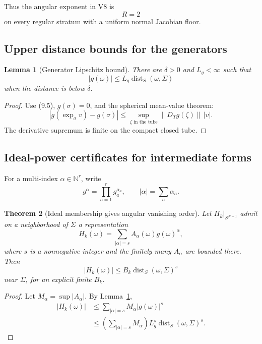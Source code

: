 \documentclass[11pt]{article}
\newtheorem{theorem}{Theorem}[section]
\newtheorem{lemma}[theorem]{Lemma}
\theoremstyle{remark}
\begin{document}
Thus the angular exponent in V8 is
\[
 R=2                                                   \tag{9.9}
\]
on every regular stratum with a uniform normal Jacobian floor.

\subsection{Upper distance bounds for the generators}

\begin{lemma}[Generator Lipschitz bound]
\label{lem:v17v9-generator-upper}
There are \(\delta>0\) and \(L_g<\infty\) such that
\[
 |g(\omega)|
 \leq L_g\operatorname{dist}_S(\omega,\Sigma)       \tag{9.10}
\]
when the distance is below \(\delta\).
\end{lemma}

\begin{proof}
Use (9.5), \(g(\sigma)=0\), and the spherical mean-value theorem:
\[
 |g(\exp_\sigma v)-g(\sigma)|
 \leq
 \sup_{\zeta\text{ in the tube}}\|D_Tg(\zeta)\|\,|v|.
\]
The derivative supremum is finite on the compact closed tube.
\end{proof}

\subsection{Ideal-power certificates for intermediate forms}

For a multi-index \(\alpha\in\mathbb N^r\), write
\[
 g^\alpha=\prod_{a=1}^rg_a^{\alpha_a},
 \qquad |\alpha|=\sum_a\alpha_a.
\]

\begin{theorem}[Ideal membership gives angular vanishing order]
\label{thm:v17v9-ideal}
Let \(H_k|_{S^{N-1}}\) admit on a neighborhood of \(\Sigma\) a
representation
\[
 H_k(\omega)
 =
 \sum_{|\alpha|=s}
 A_\alpha(\omega)g(\omega)^\alpha,                 \tag{9.11}
\]
where \(s\) is a nonnegative integer and the finitely many
\(A_\alpha\) are bounded there.  Then
\[
 |H_k(\omega)|
 \leq B_k\operatorname{dist}_S(\omega,\Sigma)^s    \tag{9.12}
\]
near \(\Sigma\), for an explicit finite \(B_k\).
\end{theorem}

\begin{proof}
Let \(M_\alpha=\sup|A_\alpha|\).  By
Lemma~\ref{lem:v17v9-generator-upper},
\[
\begin{split}
 |H_k(\omega)|
 &\leq
 \sum_{|\alpha|=s}
 M_\alpha|g(\omega)|^s\\
 &\leq
 \left(\sum_{|\alpha|=s}M_\alpha\right)
 L_g^s\operatorname{dist}_S(\omega,\Sigma)^s.
                                                               \tag{9.13}
\end{split}
\]
\end{proof}
\end{document}
